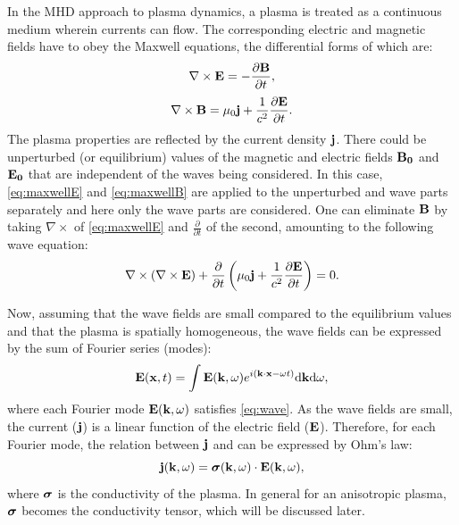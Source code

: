 In the MHD approach to plasma dynamics, a plasma is treated as a continuous medium wherein currents can flow. The corresponding electric and magnetic fields have to obey the Maxwell equations, the differential forms of which are:%
\begin{equation}\label{eq:maxwellE}
    \nabla \times \boldsymbol{\mathrm{E}} = -\frac{\partial \boldsymbol{\mathrm{B}}}{\partial t},
\end{equation}
\begin{equation}\label{eq:maxwellB}
    \nabla \times \boldsymbol{\mathrm{B}} = \mu_0\boldsymbol{\mathrm{j}} + \frac{1}{c^2}\frac{\partial \boldsymbol{\mathrm{E}}}{\partial t}.
\end{equation}
\noindent The plasma properties are reflected by the current density $\boldsymbol{\mathrm{j}}$. There could be unperturbed (or equilibrium) values of the magnetic and electric fields $\boldsymbol{\mathrm{B_0}}$ and $\boldsymbol{\mathrm{E_0}}$ that are independent of the waves being considered. In this case, \eqref{eq:maxwellE} and \eqref{eq:maxwellB} are applied to the unperturbed and wave parts separately and here only the wave parts are considered. One can eliminate $\boldsymbol{\mathrm{B}}$ by taking $\nabla \times$ of \eqref{eq:maxwellE} and $\frac{\partial}{\partial{t}}$ of the second, amounting to the following wave equation:%
\begin{equation}\label{eq:wave}
    \nabla \times (\nabla \times \boldsymbol{\mathrm{E}}) + \frac{\partial}{\partial{t}}\left( \mu_0\boldsymbol{\mathrm{j}} + \frac{1}{c^2}\frac{\partial \boldsymbol{\mathrm{E}}}{\partial t} \right) = 0.
\end{equation}

Now, assuming that the wave fields are small compared to the equilibrium values and that the plasma is spatially homogeneous, the wave fields can be expressed by the sum of Fourier series (modes):%
\begin{equation}\label{eq:fourier_transform}
  \boldsymbol{\mathrm{E}}(\boldsymbol{\mathrm{x}},t)=\int \boldsymbol{\mathrm{E}}(\boldsymbol{\mathrm{k}},\omega)e^{i(\boldsymbol{\mathrm{k}}\cdot\boldsymbol{\mathrm{x}}-\omega{t})}\mathrm{d}\boldsymbol{\mathrm{k}}\mathrm{d}\omega,
\end{equation}
\noindent where each Fourier mode $\boldsymbol{\mathrm{E}}(\boldsymbol{\mathrm{k}},\omega)$ satisfies \eqref{eq:wave}. As the wave fields are small, the current ($\boldsymbol{\mathrm{j}}$) is a linear function of the electric field ($\boldsymbol{\mathrm{E}}$). Therefore, for each Fourier mode, the relation between $\boldsymbol{\mathrm{j}}$ and  can be expressed by Ohm's law:%
\begin{equation}\label{eq:ohm_law}
  \boldsymbol{\mathrm{j}}(\boldsymbol{\mathrm{k}},\omega)=\boldsymbol{\mathrm{\sigma}}(\boldsymbol{\mathrm{k}},\omega) \cdot \boldsymbol{\mathrm{E}}(\boldsymbol{\mathrm{k}},\omega),
\end{equation}
\noindent where $\boldsymbol{\mathrm{\sigma}}$ is the conductivity of the plasma. In general for an anisotropic plasma, $\boldsymbol{\mathrm{\sigma}}$ becomes the conductivity tensor, which will be discussed later.

